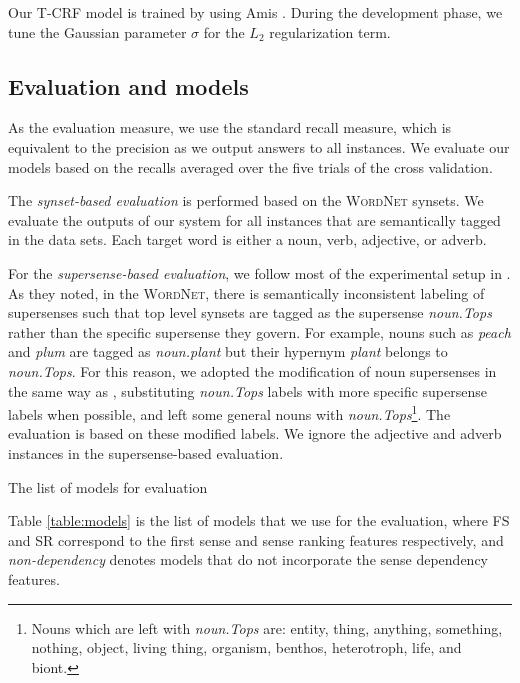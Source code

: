 \documentclass[english]{jnlp_1.4}
\begin{document}
Our T-CRF model is trained by using Amis \cite{miyao:2002}.
During the development phase, we tune the Gaussian parameter $\sigma$ for the $L_2$ regularization term.


\subsection{Evaluation and models}
\label{section:evaluation}

As the evaluation measure, we use the standard recall measure, which is equivalent to the precision as we output answers to all instances.
We evaluate our models based on the recalls averaged over the five trials of the cross validation.


The \textit{synset-based evaluation} is performed based on the \textsc{WordNet} synsets.
We evaluate the outputs of our system for all instances that are semantically tagged in the data sets.
Each target word is either a noun, verb, adjective, or adverb.


For the \textit{supersense-based evaluation}, we follow most of the experimental setup in \cite{ciaramita:2006}.
As they noted, in the \textsc{WordNet}, there is semantically inconsistent labeling of supersenses such that top level synsets are tagged as the supersense \textit{noun.Tops} rather than the specific supersense they govern.
For example, nouns such as \textit{peach} and \textit{plum} are tagged as \textit{noun.plant} but their hypernym \textit{plant} belongs to \textit{noun.Tops}.
For this reason, we adopted the modification of noun supersenses in the same way as \cite{ciaramita:2006}, substituting \textit{noun.Tops} labels with more specific supersense labels when possible, and left some general nouns with \textit{noun.Tops}\footnote{Nouns which are left with \textit{noun.Tops} are: entity, thing, anything, something, nothing, object, living thing, organism, benthos, heterotroph, life, and biont.}.
The evaluation is based on these modified labels.
We ignore the adjective and adverb instances in the supersense-based evaluation.


\begin{table}[b]
\caption{The list of models for evaluation}
\label{table:models}

\end{table}


Table \ref{table:models} is the list of models that we use for the evaluation, where FS and SR correspond to the first sense and sense ranking features respectively, and \textit{non-dependency} denotes models that do not incorporate the sense dependency features.
\end{document}
